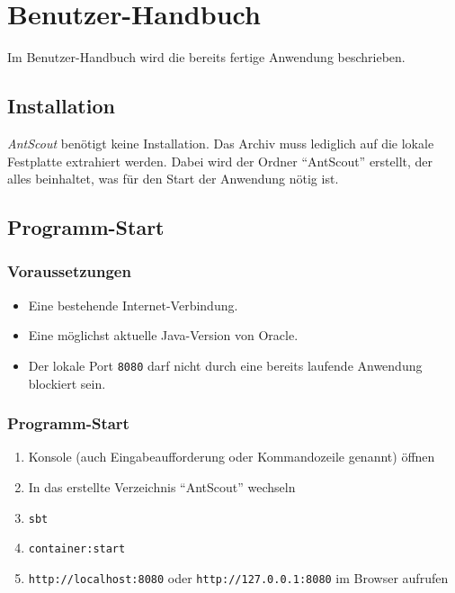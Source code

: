 \chapter{Benutzer-Handbuch}
\label{chap:benutzer-handbuch}

Im Benutzer-Handbuch wird die bereits fertige Anwendung beschrieben.


\section{Installation}
\label{sec:installation}

\textit{AntScout} benötigt keine Installation.
Das Archiv muss lediglich auf die lokale Festplatte extrahiert werden.
Dabei wird der Ordner ``AntScout'' erstellt, der alles beinhaltet, was für den Start der Anwendung nötig ist.

\section{Programm-Start}
\label{sec:programmstart}

\subsection{Voraussetzungen}
\label{sec:voraussetzungen}

\begin{itemize}
  \item Eine bestehende Internet-Verbindung.
  \item Eine möglichst aktuelle Java-Version von Oracle.
  \item Der lokale Port \texttt{8080} darf nicht durch eine bereits laufende Anwendung blockiert sein.
\end{itemize}

\subsection{Programm-Start}
\label{sec:programm-start}

\begin{enumerate}
  \item Konsole (auch Eingabeaufforderung oder Kommandozeile genannt) öffnen
  \item In das erstellte Verzeichnis ``AntScout'' wechseln
  \item \texttt{sbt}
  \item \texttt{container:start}
  \item \texttt{http://localhost:8080} oder \texttt{http://127.0.0.1:8080} im Browser aufrufen
\end{enumerate}

